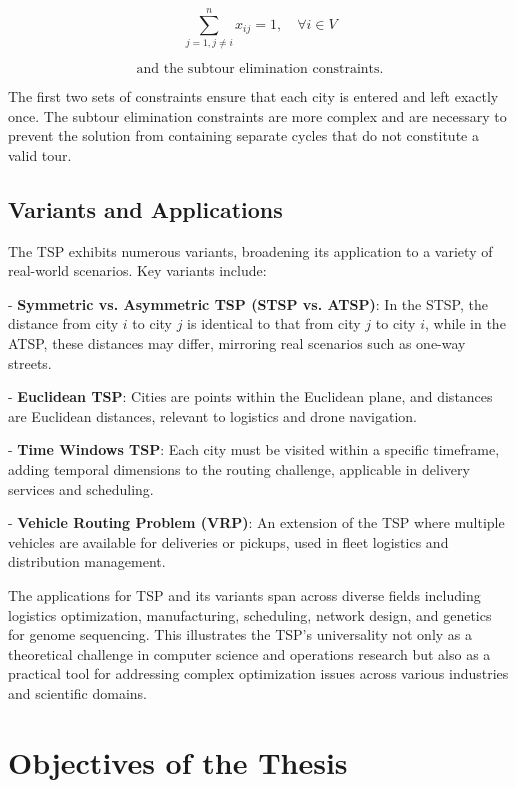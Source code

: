 \[
    \sum_{j=1, j \ne i}^{n} x_{ij} = 1, \quad \forall i \in V
\]

\[
    \text{and the subtour elimination constraints.}
\]

The first two sets of constraints ensure that each city is entered and left exactly once. The subtour elimination constraints are more complex and are necessary to prevent the solution from containing separate cycles that do not constitute a valid tour.

\subsection{Variants and Applications}


The TSP exhibits numerous variants, broadening its application to a variety of real-world scenarios. Key variants include:

- \textbf{Symmetric vs. Asymmetric TSP (STSP vs. ATSP)}: In the STSP, the distance from city $i$ to city $j$ is identical to that from city $j$ to city $i$, while in the ATSP, these distances may differ, mirroring real scenarios such as one-way streets.

- \textbf{Euclidean TSP}: Cities are points within the Euclidean plane, and distances are Euclidean distances, relevant to logistics and drone navigation.

- \textbf{Time Windows TSP}: Each city must be visited within a specific timeframe, adding temporal dimensions to the routing challenge, applicable in delivery services and scheduling.

- \textbf{Vehicle Routing Problem (VRP)}: An extension of the TSP where multiple vehicles are available for deliveries or pickups, used in fleet logistics and distribution management.

The applications for TSP and its variants span across diverse fields including logistics optimization, manufacturing, scheduling, network design, and genetics for genome sequencing. This illustrates the TSP's universality not only as a theoretical challenge in computer science and operations research but also as a practical tool for addressing complex optimization issues across various industries and scientific domains.

\section{Objectives of the Thesis}

